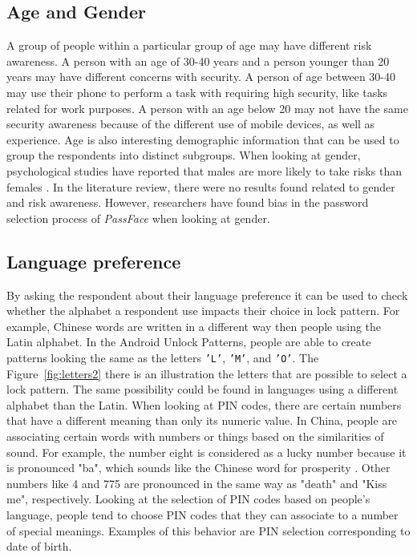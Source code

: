      \subsection*{Age and Gender} 
      A group of people within a particular group of age may have different risk awareness. A person with an age of 30-40 years and a person younger than 20 years may have different concerns with security. A person of age between 30-40 may use their phone to perform a task with requiring high security, like tasks related for work purposes. A person with an age below 20 may not have the same security awareness because of the different use of mobile devices, as well as experience. Age is also interesting demographic information that can be used to group the respondents into distinct subgroups. When looking at gender, psychological studies have reported that males are more likely to take risks than females \cite{Byrnes}. In the literature review, there were no results found related to gender and risk awareness. However, researchers have found bias in the password selection process of {\it PassFace} when looking at gender.

      \subsection*{Language preference}
      By asking the respondent about their language preference it can be used to check whether the alphabet a respondent use impacts their choice in lock pattern. For example, Chinese words are written in a different way then people using the Latin alphabet. In the Android Unlock Patterns, people are able to create patterns looking the same as the letters \texttt{'L'}, \texttt{'M'}, and \texttt{'O'}. The Figure~\ref{fig:letters2} there is an illustration the letters that are possible to select a lock pattern. The same possibility could be found in languages using a different alphabet than the Latin. When looking at PIN codes, there are certain numbers that have a different meaning than only its numeric value. In China, people are associating certain words with numbers or things based on the similarities of sound. For example, the number eight is considered as a lucky number because it is pronounced "ba", which sounds like the Chinese word for prosperity \cite{ChineseChatCodes}. Other numbers like 4 and 775 are pronounced in the same way as "death" and "Kiss me", respectively. Looking at the selection of PIN codes based on people's language, people tend to choose PIN codes that they can associate to a number of special meanings. Examples of this behavior are PIN selection corresponding to date of birth. 

